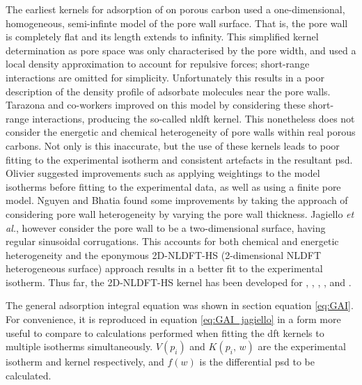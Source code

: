 The earliest kernels for \gls{adsorption} of  on porous carbon used a one-dimensional, homogeneous, semi-infinte model of the pore wall surface.\citep{seaton1989new} That is, the pore wall is completely flat and its length extends to infinity. This simplified kernel determination as pore space was only characterised by the pore width, and used a local density approximation to account for repulsive forces; short-range interactions are omitted for simplicity. Unfortunately this results in a poor description of the density profile of \gls{adsorbate} molecules near the pore walls. Tarazona and co-workers improved on this model by considering these short-range interactions, producing the so-called \acrfull{nldft} kernel.\citep{tarazona1985free, tarazona1987phase} This nonetheless does not consider the energetic and chemical heterogeneity of pore walls within real porous carbons. Not only is this inaccurate, but the use of these kernels leads to poor fitting to the experimental isotherm and consistent artefacts in the resultant \acrshort{psd}.\citep{Jagiello20132D,  olivier1998improving, lueking2009tests, nguyen2004characterization} Olivier suggested improvements such as applying weightings to the model isotherms before fitting to the experimental data, as well as using a finite pore model.\citep{olivier1998improving} Nguyen and Bhatia found some improvements by taking the approach of considering pore wall heterogeneity by varying the pore wall thickness.\citep{nguyen2004characterization} Jagiello \textit{et al.}, however consider the pore wall to be a two-dimensional surface, having regular sinusoidal corrugations. This accounts for both chemical and energetic heterogeneity\citep{Jagiello20132D} and the eponymous 2D-NLDFT-HS (2-dimensional NLDFT heterogeneous surface) approach results in a better fit to the experimental isotherm.\citep{Jagiello20132D, puziy2016comparison, shi2021current} Thus far, the 2D-NLDFT-HS kernel has been developed for , , , , and .\citep{Jagiello20132D, Jagiello2013, jagiello2019consistency, Jagiello2020Exploiting}

The general \gls{adsorption} integral equation was shown in section equation \ref{eq:GAI}. For convenience, it is reproduced in equation \ref{eq:GAI_jagiello} in a form more useful to compare to calculations performed when fitting the \acrshort{dft} kernels to multiple isotherms simultaneously. $V(p_i)$ and $K(p_i,\,w)$ are the experimental isotherm and kernel respectively, and $f(w)$ is the differential \acrshort{psd} to be calculated.


